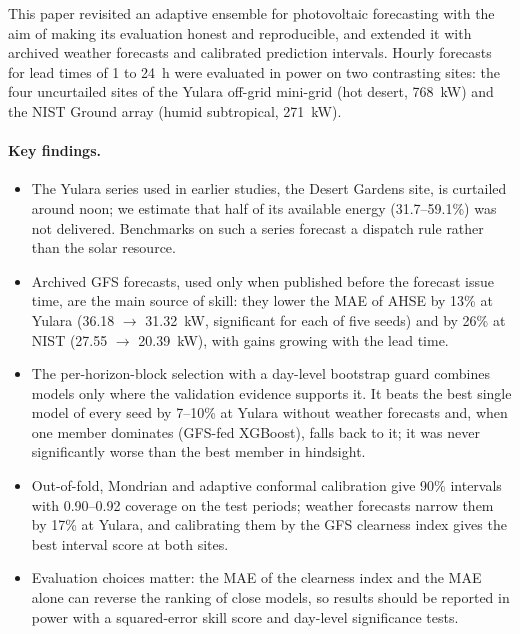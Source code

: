 
This paper revisited an adaptive ensemble for photovoltaic forecasting with the aim of making
its evaluation honest and reproducible, and extended it with archived weather forecasts and
calibrated prediction intervals. Hourly forecasts for lead times of 1 to 24~h were evaluated in
power on two contrasting sites: the four uncurtailed sites of the Yulara off-grid mini-grid
(hot desert, 768~kW) and the NIST Ground array (humid subtropical, 271~kW).

\paragraph{Key findings.}
\begin{itemize}
  \item The Yulara series used in earlier studies, the Desert Gardens site, is curtailed around
  noon; we estimate that half of its available energy (31.7--59.1\%) was not delivered. Benchmarks
  on such a series forecast a dispatch rule rather than the solar resource.

  \item Archived GFS forecasts, used only when published before the forecast issue time, are the
  main source of skill: they lower the MAE of AHSE by 13\% at Yulara (36.18 $\to$ 31.32~kW,
  significant for each of five seeds) and by 26\% at NIST (27.55 $\to$ 20.39~kW), with gains
  growing with the lead time.

  \item The per-horizon-block selection with a day-level bootstrap guard combines models only
  where the validation evidence supports it. It beats the best single model of every seed by
  7--10\% at Yulara without weather forecasts and, when one member dominates (GFS-fed XGBoost),
  falls back to it; it was never significantly worse than the best member in hindsight.

  \item Out-of-fold, Mondrian and adaptive conformal calibration give 90\% intervals with
  0.90--0.92 coverage on the test periods; weather forecasts narrow them by 17\% at Yulara, and
  calibrating them by the GFS clearness index gives the best interval score at both sites.

  \item Evaluation choices matter: the MAE of the clearness index and the MAE alone can reverse
  the ranking of close models, so results should be reported in power with a squared-error skill
  score and day-level significance tests.
\end{itemize}


